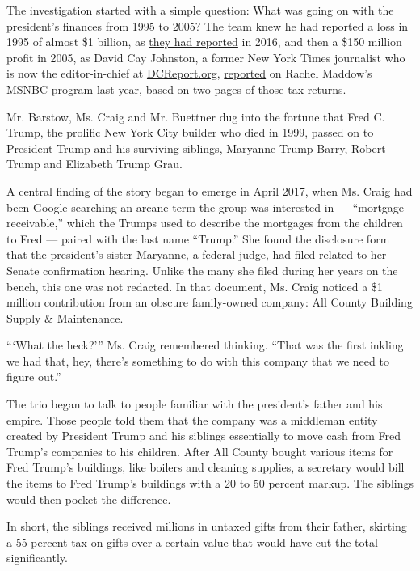 The investigation started with a simple question: What was going on with
the president's finances from 1995 to 2005? The team knew he had
reported a loss in 1995 of almost \$1 billion, as
\href{https://www.nytimes3xbfgragh.onion/2016/10/02/us/politics/donald-trump-taxes.html}{they
had reported} in 2016, and then a \$150 million profit in 2005, as David
Cay Johnston, a former New York Times journalist who is now the
editor-in-chief at \href{https://www.dcreport.org/}{DCReport.org},
\href{https://www.nytimes3xbfgragh.onion/2017/03/14/us/politics/donald-trump-taxes.html}{reported}
on Rachel Maddow's MSNBC program last year, based on two pages of those
tax returns.

Mr. Barstow, Ms. Craig and Mr. Buettner dug into the fortune that Fred
C. Trump, the prolific New York City builder who died in 1999, passed on
to President Trump and his surviving siblings, Maryanne Trump Barry,
Robert Trump and Elizabeth Trump Grau.

A central finding of the story began to emerge in April 2017, when Ms.
Craig had been Google searching an arcane term the group was interested
in --- ``mortgage receivable,'' which the Trumps used to describe the
mortgages from the children to Fred --- paired with the last name
``Trump.'' She found the disclosure form that the president's sister
Maryanne, a federal judge, had filed related to her Senate confirmation
hearing. Unlike the many she filed during her years on the bench, this
one was not redacted. In that document, Ms. Craig noticed a \$1 million
contribution from an obscure family-owned company: All County Building
Supply \& Maintenance.

```What the heck?''' Ms. Craig remembered thinking. ``That was the first
inkling we had that, hey, there's something to do with this company that
we need to figure out.''

The trio began to talk to people familiar with the president's father
and his empire. Those people told them that the company was a middleman
entity created by President Trump and his siblings essentially to move
cash from Fred Trump's companies to his children. After All County
bought various items for Fred Trump's buildings, like boilers and
cleaning supplies, a secretary would bill the items to Fred Trump's
buildings with a 20 to 50 percent markup. The siblings would then pocket
the difference.

In short, the siblings received millions in untaxed gifts from their
father, skirting a 55 percent tax on gifts over a certain value that
would have cut the total significantly.

